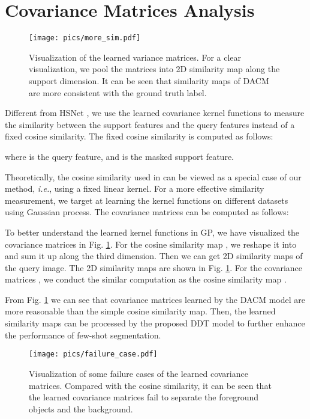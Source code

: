 \documentclass[runningheads]{llncs}
\begin{document}
\section{Covariance Matrices Analysis}

\begin{figure}
	\centering
	\texttt{[image: pics/more\_sim.pdf]}
	\caption{Visualization of the learned variance matrices. For a clear visualization, we pool the matrices into 2D similarity map along the support dimension. It can be seen that similarity maps of DACM are more consistent with the ground truth label.}
	\label{more_sim}
\end{figure}

Different from HSNet \cite{min2021hypercorrelation}, we use the learned covariance kernel functions to measure the similarity between the support features and the query features instead of a fixed cosine similarity. The fixed cosine similarity is computed as follows:

where  is the query feature, and  is the masked support feature.

Theoretically, the cosine similarity used in \cite{min2021hypercorrelation} can be viewed as a special case of our method, \emph{i.e.}, using a fixed linear kernel. For a more effective similarity measurement, we target at learning the kernel functions  on different datasets using Gaussian process. The covariance matrices can be computed as follows:

To better understand the learned kernel functions in GP, we have visualized the covariance matrices in Fig. \ref{more_sim}. For the cosine similarity map , we reshape it into  and sum it up along the third dimension. Then we can get 2D similarity maps of the query image. The 2D similarity maps are shown in Fig. \ref{more_sim}. For the covariance matrices , we conduct the similar computation as the cosine similarity map . 

From Fig. \ref{more_sim} we can see that covariance matrices learned by the DACM model are more reasonable than the simple cosine similarity map. Then, the learned similarity maps can be processed by the proposed DDT model to further enhance the performance of few-shot segmentation.


\begin{figure*}[t]
	\centering
	\texttt{[image: pics/failure\_case.pdf]}
	\caption{Visualization of some failure cases of the learned covariance matrices. Compared with the cosine similarity, it can be  seen that the learned covariance matrices fail to separate the foreground objects and the background.
}
	\label{fail_sim}
\end{figure*} 
\end{document}
